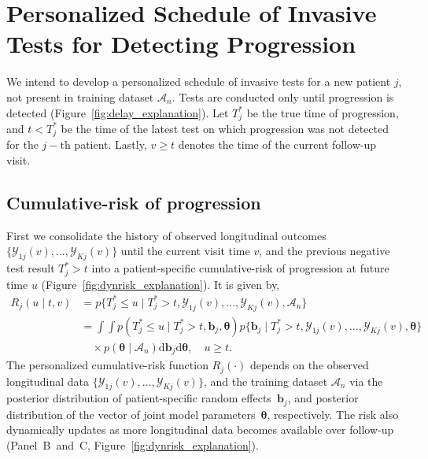 \section{Personalized Schedule of Invasive Tests for Detecting Progression}
\label{sec:schedule}
We intend to develop a personalized schedule of invasive tests for a new patient $j$, not present in training dataset $\mathcal{A}_n$. Tests are conducted only until progression is detected (Figure~\ref{fig:delay_explanation}). Let $T^*_j$ be the true time of progression, and ${t < T^*_j}$ be the time of the latest test on which progression was not detected for the ${j-\mbox{th}}$ patient. Lastly, ${v \geq t}$ denotes the time of the current follow-up visit.

\subsection{Cumulative-risk of progression}
\label{subsec:cum_risk}
First we consolidate the history of observed longitudinal outcomes $\{\mathcal{Y}_{1j}(v), \ldots, \mathcal{Y}_{Kj}(v)\}$ until the current visit time $v$, and the previous negative test result ${T^*_j > t}$ into a patient-specific cumulative-risk of progression at future time $u$ (Figure~\ref{fig:dynrisk_explanation}). It is given by,
\begin{equation}
\label{eq:cumulative_risk}
\begin{split}
R_j(u \mid t, v) &= p\big\{T^*_j \leq u \mid T^*_j > t, \mathcal{Y}_{1j}(v), \ldots, \mathcal{Y}_{Kj}(v), \mathcal{A}_n\big\}\\
&=\int \int p(T^*_j \leq u \mid T^*_j > t, \boldsymbol{b}_{j}, \boldsymbol{\theta}) p\big\{\boldsymbol{b}_j \mid T^*_j > t, \mathcal{Y}_{1j}(v), \ldots, \mathcal{Y}_{Kj}(v), \boldsymbol{\theta} \big\}\\
&\quad \times p(\boldsymbol{\theta} \mid \mathcal{A}_n) \mathrm{d}\boldsymbol{b}_j \mathrm{d}\boldsymbol{\theta}, \quad u \geq t.
\end{split}
\end{equation}
The personalized cumulative-risk function $R_j(\cdot)$ depends on the observed longitudinal data $\{\mathcal{Y}_{1j}(v), \ldots, \mathcal{Y}_{Kj}(v)\}$, and the training dataset $\mathcal{A}_n$ via the posterior distribution of patient-specific random effects~$\boldsymbol{b}_j$, and posterior distribution of the vector of joint model parameters~$\boldsymbol{\theta}$, respectively. The risk also dynamically updates as more longitudinal data becomes available over follow-up (Panel~B~and~C, Figure~\ref{fig:dynrisk_explanation}).

